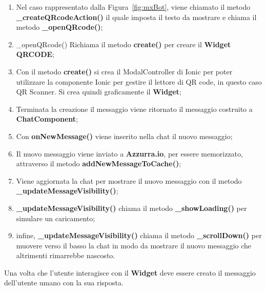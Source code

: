 \begin{enumerate}
	\item Nel caso rappresentato dalla Figura~\ref{fig:mxBot}, viene chiamato il metodo \textbf{\_createQRcodeAction()} il quale imposta il testo da mostrare e chiama il metodo \textbf{\_openQRcode()};
	\item {\_openQRcode()} Richiama il metodo \textbf{create()} per creare il \textbf{Widget} \textbf{QRCODE};
	\item Con il metodo \textbf{create()} si crea il ModalController di Ionic per poter utilizzare la componente Ionic per gestire il lettore di QR code, in questo caso QR Scanner. Si crea quindi graficamente il \textbf{Widget};
	\item Terminata la creazione il messaggio viene ritornato il messaggio costruito a \textbf{ChatComponent};
	\item Con \textbf{onNewMessage()} viene inserito nella chat il nuovo messaggio;
	\item Il nuovo messaggio viene inviato a \textbf{Azzurra.io}, per essere memorizzato, attraverso il metodo \textbf{addNewMessageToCache()};
	\item Viene aggiornata la chat per mostrare il nuovo messaggio con il metodo \textbf{\_updateMessageVisibility()};
	\item \textbf{\_updateMessageVisibility()} chiama il metodo \textbf{\_showLoading()}  per simulare un caricamento;
	\item infine, \textbf{\_updateMessageVisibility()} chiama il metodo \textbf{\_scrollDown()} per muovere verso il basso la chat in modo da mostrare il nuovo messaggio che altrimenti rimarrebbe nascosto.
\end{enumerate}

Una volta che l'utente interagisce con il \textbf{Widget} deve essere creato il messaggio dell'utente umano con la sua risposta. 
\clearpage
